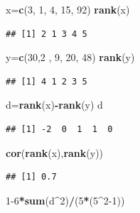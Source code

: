 \documentclass[
]{article}
\newenvironment{Shaded}{\begin{snugshade}}{\end{snugshade}}
\newcommand{\DecValTok}[1]{\textcolor[rgb]{0.00,0.00,0.81}{#1}}
\newcommand{\KeywordTok}[1]{\textcolor[rgb]{0.13,0.29,0.53}{\textbf{#1}}}
\newcommand{\NormalTok}[1]{#1}
\newcommand{\OperatorTok}[1]{\textcolor[rgb]{0.81,0.36,0.00}{\textbf{#1}}}
\begin{document}
\begin{Shaded}
\begin{Highlighting}[]
\NormalTok{x=}\KeywordTok{c}\NormalTok{(}\DecValTok{3}\NormalTok{, }\DecValTok{1}\NormalTok{, }\DecValTok{4}\NormalTok{, }\DecValTok{15}\NormalTok{, }\DecValTok{92}\NormalTok{)}
\KeywordTok{rank}\NormalTok{(x)}
\end{Highlighting}
\end{Shaded}

\begin{verbatim}
## [1] 2 1 3 4 5
\end{verbatim}

\begin{Shaded}
\begin{Highlighting}[]
\NormalTok{y=}\KeywordTok{c}\NormalTok{(}\DecValTok{30}\NormalTok{,}\DecValTok{2}\NormalTok{ , }\DecValTok{9}\NormalTok{, }\DecValTok{20}\NormalTok{, }\DecValTok{48}\NormalTok{)}
\KeywordTok{rank}\NormalTok{(y)}
\end{Highlighting}
\end{Shaded}

\begin{verbatim}
## [1] 4 1 2 3 5
\end{verbatim}

\begin{Shaded}
\begin{Highlighting}[]
\NormalTok{d=}\KeywordTok{rank}\NormalTok{(x)}\OperatorTok{-}\KeywordTok{rank}\NormalTok{(y)}
\NormalTok{d}
\end{Highlighting}
\end{Shaded}

\begin{verbatim}
## [1] -2  0  1  1  0
\end{verbatim}

\begin{Shaded}
\begin{Highlighting}[]
\KeywordTok{cor}\NormalTok{(}\KeywordTok{rank}\NormalTok{(x),}\KeywordTok{rank}\NormalTok{(y))}
\end{Highlighting}
\end{Shaded}

\begin{verbatim}
## [1] 0.7
\end{verbatim}

\begin{Shaded}
\begin{Highlighting}[]
\DecValTok{1-6}\OperatorTok{*}\KeywordTok{sum}\NormalTok{(d}\OperatorTok{^}\DecValTok{2}\NormalTok{)}\OperatorTok{/}\NormalTok{(}\DecValTok{5}\OperatorTok{*}\NormalTok{(}\DecValTok{5}\OperatorTok{^}\DecValTok{2-1}\NormalTok{))}
\end{Highlighting}
\end{Shaded}
\end{document}
